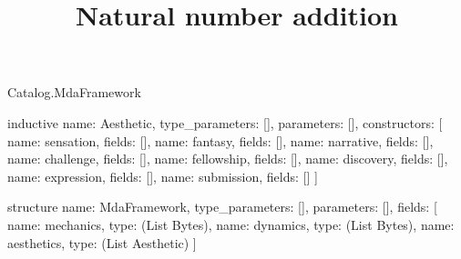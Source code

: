 \begin{lexlean}{Catalog.MdaFramework}
\title{Natural number addition}
\begin{semanticmodule}
inductive{
  name: Aesthetic,
  type_parameters: [],
  parameters: [],
  constructors: [
    {name: sensation, fields: []},
    {name: fantasy, fields: []},
    {name: narrative, fields: []},
    {name: challenge, fields: []},
    {name: fellowship, fields: []},
    {name: discovery, fields: []},
    {name: expression, fields: []},
    {name: submission, fields: []}
  ]
}

structure{
  name: MdaFramework,
  type_parameters: [],
  parameters: [],
  fields: [
    {name: mechanics, type: (List Bytes)},
    {name: dynamics, type: (List Bytes)},
    {name: aesthetics, type: (List Aesthetic)}
  ]
}
\end{semanticmodule}
\end{lexlean}
